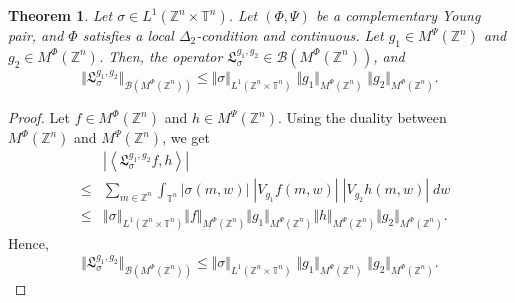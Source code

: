 \documentclass[a4paper,11pt, reqno]{amsart}
\theoremstyle{plain}
\newtheorem{theorem}{Theorem}[section]
\theoremstyle{definition}
\theoremstyle{remark}
\def \Z{{\mathbb Z}}
\def \T{{\mathbb T}}
\begin{document}
\begin{theorem}\label{th3}
Let $\sigma \in L^1(\Z^n \times \T^n)$. Let $\left(\Phi, \Psi \right)$ be a complementary Young pair, and $\Phi$ satisfies a local $\Delta_2$-condition and continuous. Let $g_1 \in M^{\Psi}(\Z^n)$ and $g_2 \in  M^{\Phi}(\Z^n)$. Then, the operator $ \mathfrak{L}^{g_1, g_2}_{\sigma} \in \mathcal{B}(M^{\Phi}(\Z^n))$, and 
\[ \Vert \mathfrak{L}^{g_1, g_2}_{\sigma} \Vert_{\mathcal{B}(M^{\Phi}(\Z^n))} \leq \Vert \sigma \Vert_{L^1(\Z^n \times \T^n)} \; \Vert g_1 \Vert_{M^{\Psi}(\Z^n)} \; \Vert g_2 \Vert_{M^{\Phi}(\Z^n)}. \]
\end{theorem}
\begin{proof}
Let $f \in M^{\Phi}(\Z^n)$ and $h \in M^{\Psi}(\Z^n)$. Using the duality between $M^{\Phi}(\Z^n)$ and $M^{\Psi}(\Z^n)$, we get 
\begin{eqnarray*}
&& \left| \left\langle \mathfrak{L}^{g_1, g_2}_{\sigma}f, h \right\rangle \right| \\
& \leq & \sum_{m \in \Z^n}  \int_{\T^n} |\sigma(m, w)| \; \left|V_{g_1}f(m, w) \right| \; \left| V_{g_2}h(m, w) \right| \; dw  \\ 
& \leq & \left\Vert \sigma \right\Vert_{L^1(\Z^n \times \T^n)} \Vert f \Vert_{M^{\Phi}(\Z^n)} \Vert g_1 \Vert_{M^{\Psi}(\Z^n)} \Vert h \Vert_{M^{\Psi}(\Z^n)} \Vert g_2 \Vert_{M^{\Phi}(\Z^n)} .
\end{eqnarray*}
Hence,
\[ \Vert \mathfrak{L}^{g_1, g_2}_{\sigma} \Vert_{\mathcal{B}(M^{\Phi}(\Z^n))} \leq \Vert \sigma \Vert_{L^1(\Z^n \times \T^n)} \; \Vert g_1 \Vert_{M^{\Psi}(\Z^n)} \; \Vert g_2 \Vert_{M^{\Phi}(\Z^n)}. \]
\end{proof}
\end{document}
